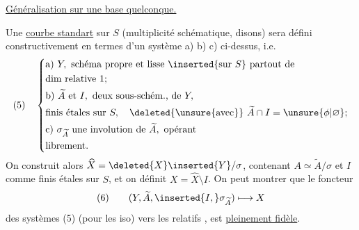 \uline{Généralisation sur une base quelconque.}

Une \uline{courbe standart} sur $S$ (multiplicité schématique, disons) sera défini constructivement en termes d'un système a) b) c)  ci-dessus, i.e.
\[
(5)\quad\left\{\begin{aligned}
&\text{a) }Y,\text{ schéma propre et lisse }\inserted{\text{sur }S}\text{ partout de}\\
&\text{dim relative }1;\\
&\text{b) }\widetilde A\text{ et }I,\text{ deux sous-schém., de }Y,\\
&\text{finis étales sur }S,\quad\deleted{\unsure{\text{avec}}}\ \widetilde A\cap I=\unsure{\phi|\varnothing};\\
&\text{c) }\sigma_{\widetilde A}\text{ une involution de }\widetilde A,\text{ opérant}\\
&\text{librement.}
\end{aligned}\right.
\]
On construit alors $\widehat X=\deleted{X}\inserted{Y}/\sigma$, contenant $A\simeq\widetilde A/\sigma$ et $I$ comme   finis étales sur $S$, et on définit $X=\widehat X\setminus I$. On peut montrer que le foncteur
\[
(6)\qquad(Y,\widetilde A,\inserted{I,}\sigma_{\widetilde A})\longmapsto X
\]
des systèmes (5) (pour les iso) vers les  relatifs , est \uline{pleinement fidèle}.
